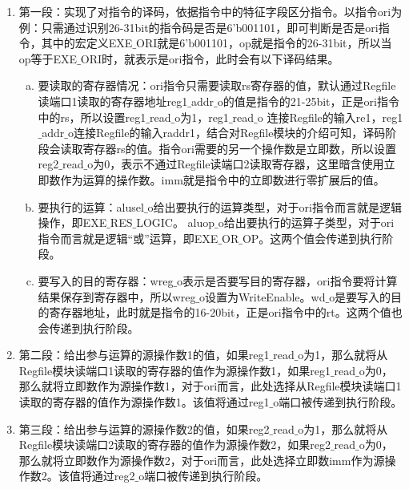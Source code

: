 \begin{enumerate}[(1)]
	\item 第一段：实现了对指令的译码，依据指令中的特征字段区分指令。以指令ori为例：只需通过识别26-31bit的指令码是否是6'b001101，即可判断是否是ori指令，其中的宏定义EXE$\_$ORI就是6'b001101，op就是指令的26-31bit，所以当op等于EXE$\_$ORI时，就表示是ori指令，此时会有以下译码结果。
	
	\begin{enumerate}[(a)]
		\item 要读取的寄存器情况：ori指令只需要读取rs寄存器的值，默认通过Regfile读端口1读取的寄存器地址reg1$\_$addr$\_$o的值是指令的21-25bit，正是ori指令中的rs，所以设置reg1$\_$read$\_$o为1，reg1$\_$read$\_$o 连接Regfile的输入re1，reg1$\_$addr$\_$o连接Regfile的输入raddr1，结合对Regfile模块的介绍可知，译码阶段会读取寄存器rs的值。指令ori需要的另一个操作数是立即数，所以设置reg2$\_$read$\_$o为0，表示不通过Regfile读端口2读取寄存器，这里暗含使用立即数作为运算的操作数。imm就是指令中的立即数进行零扩展后的值。
		
		\item 要执行的运算：alusel$\_$o给出要执行的运算类型，对于ori指令而言就是逻辑操作，即EXE$\_$RES$\_$LOGIC。 aluop$\_$o给出要执行的运算子类型，对于ori指令而言就是逻辑“或”运算，即EXE$\_$OR$\_$OP。这两个值会传递到执行阶段。
		
		\item 要写入的目的寄存器：wreg$\_$o表示是否要写目的寄存器，ori指令要将计算结果保存到寄存器中，所以wreg$\_$o设置为WriteEnable。wd$\_$o是要写入的目的寄存器地址，此时就是指令的16-20bit，正是ori指令中的rt。这两个值也会传递到执行阶段。
	\end{enumerate}
	
	\item 第二段：给出参与运算的源操作数1的值，如果reg1$\_$read$\_$o为1，那么就将从Regfile模块读端口1读取的寄存器的值作为源操作数1，如果reg1$\_$read$\_$o为0，那么就将立即数作为源操作数1，对于ori而言，此处选择从Regfile模块读端口1读取的寄存器的值作为源操作数1。该值将通过reg1$\_$o端口被传递到执行阶段。
	
	\item 第三段：给出参与运算的源操作数2的值，如果reg2$\_$read$\_$o为1，那么就将从Regfile模块读端口2读取的寄存器的值作为源操作数2，如果reg2$\_$read$\_$o为0，那么就将立即数作为源操作数2，对于ori而言，此处选择立即数imm作为源操作数2。该值将通过reg2$\_$o端口被传递到执行阶段。
\end{enumerate}


